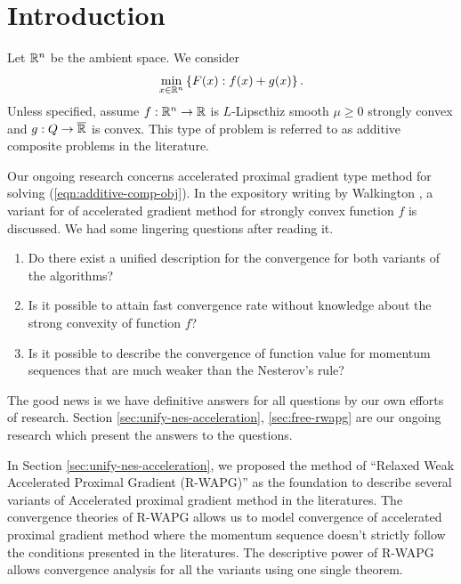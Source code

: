 \documentclass[12pt]{article}
\begin{document}
\section{Introduction}
    Let $\mathbb R^n$ be the ambient space. We consider 
    \begin{align}
        \min_{x \in \mathbb R^n} \left\lbrace
            F(x): f(x) + g(x)
        \right\rbrace.
    \end{align}\label{eqn:additive-comp-obj}
    Unless specified, assume $f:\mathbb R^n \rightarrow \mathbb R$ is $L$-Lipscthiz smooth $\mu \ge 0$ strongly convex and $g:Q \rightarrow \overline {\mathbb R}$ is convex. 
    This type of problem is referred to as additive composite problems in the literature. 
    \par
    Our ongoing research concerns accelerated proximal gradient type method for solving (\ref{eqn:additive-comp-obj}). 
    In the expository writing by Walkington \cite{noel_nesterovs_nodate}, a variant for of accelerated gradient method for strongly convex function $f$ is discussed. 
    We had some lingering questions after reading it. 
    \begin{enumerate}
        \item Do there exist a unified description for the convergence for both variants of the algorithms?
        \item Is it possible to attain fast convergence rate without knowledge about the strong convexity of function $f$?
        \item Is it possible to describe the convergence of function value for momentum sequences that are much weaker than the Nesterov's rule? 
    \end{enumerate}
    The good news is we have definitive answers for all questions by our own efforts of research. 
    Section \ref{sec:unify-nes-acceleration}, \ref{sec:free-rwapg} are our ongoing research which present the answers to the questions. 
    \par
    In Section \ref{sec:unify-nes-acceleration}, we proposed the method of ``Relaxed Weak Accelerated Proximal Gradient (R-WAPG)'' as the foundation to describe several variants of Accelerated proximal gradient method in the literatures. 
    The convergence theories of R-WAPG allows us to model convergence of accelerated proximal gradient method where the momentum sequence doesn't strictly follow the conditions presented in the literatures. 
    The descriptive power of R-WAPG allows convergence analysis for all the variants using one single theorem. 
\end{document}
